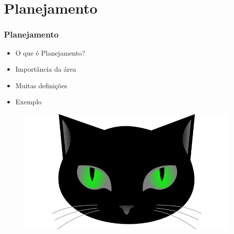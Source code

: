 \section{Planejamento}


\begin{frame}
\frametitle{Planejamento}
\begin{minipage}{0.47\textwidth}
    \begin{itemize}
        \item O que é Planejamento?
        \item Importância da área
        \item Muitas definições
        \item Exemplo
    \end{itemize}
\end{minipage}
\begin{minipage}{0.5\textwidth}
\begin{figure}[ht!]
\begin{center}
\includegraphics[width=1.2\textwidth, height=0.40\textheight]{figures/logo_picat_alex.jpg}
\end{center}
\end{figure}
\end{minipage}
\end{frame}

